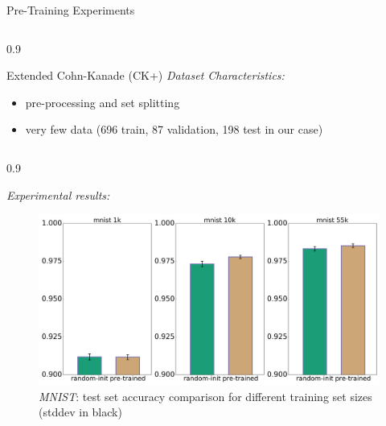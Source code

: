 \documentclass[final]{beamer}
\newlength{\onecolwid}
\newlength{\threecolwid}
\begin{document}
\begin{frame}[t]
\begin{columns}[t]
\begin{column}{\threecolwid}
\begin{alertblock}{Pre-Training Experiments}
\begin{columns}[t, totalwidth=0.9\threecolwid]
\begin{column}{0.9\onecolwid}
\begin{block}{Extended Cohn-Kanade (CK+)}
	\emph{Dataset Characteristics:}\\
	\begin{itemize} 
		\item pre-processing and set splitting %
		\item very few data (696 train, 87 validation, 198 test in our case)
	\end{itemize}

	\end{block}

	\end{column}

\end{columns}


\begin{columns}[t, totalwidth=0.9\threecolwid] %


	\begin{column}{0.9\onecolwid} %
	\begin{block}{}
	\emph{Experimental results:}

	\begin{figure}
	\includegraphics[width=\linewidth]{box_plots/boxplots_mnist.png}
	\caption{\emph{MNIST}: test set accuracy comparison for different training set sizes (stddev in black)}
	\label{fig:mnist_plot}
	\end{figure}


\end{block}
\end{column}
\end{columns}
\end{alertblock}
\end{column}
\end{columns}
\end{frame}
\end{document}
